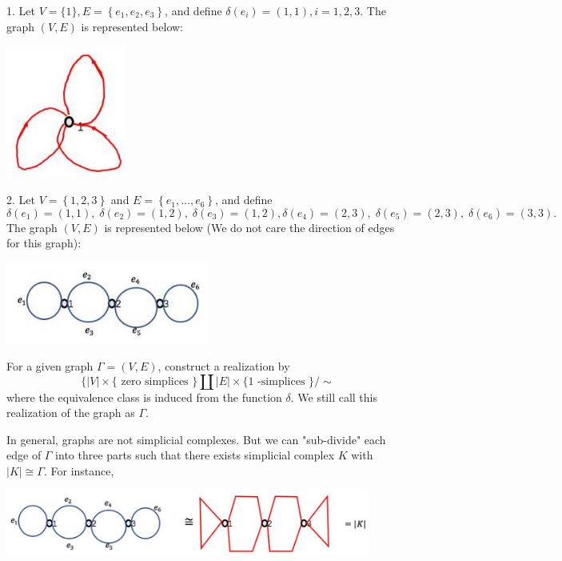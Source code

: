 \begin{example} 1. Let \(V = \{ 1\},E = \left\{  {{e}_{1},{e}_{2},{e}_{3}}\right\}\), and define \(\delta \left( {e}_{i}\right)  = \left( {1,1}\right),i = 1,2,3\). The graph $(V, E)$ is represented below:
\begin{center}
\includegraphics[width=0.3\textwidth]{images/Ch8_3_petal.jpg}
\end{center}

2. Let \(V = \left\{  1,2,3\right\}\) and \(E = \left\{  {{e}_{1},\ldots,{e}_{6}}\right\}\), and define
\[
\delta \left( {e}_{1}\right)  = \left( {1,1}\right),\;\delta \left( {e}_{2}\right)  = \left( {1,2}\right),\;\delta \left( {e}_{3}\right)  = \left( {1,2}\right),
\delta \left( {e}_{4}\right)  = \left( {2,3}\right),\;\delta \left( {e}_{5}\right)  = \left( {2,3}\right),\;\delta \left( {e}_{6}\right)  = \left( {3,3}\right).
\]
The graph $(V, E)$ is represented below (We do not care the direction of edges for this graph):
\begin{center}
\includegraphics[width=0.5\textwidth]{images/Ch8_4_circles.jpg}
\end{center}
\end{example}

\begin{definition}  For a given graph \(\Gamma  = \left( {V,E}\right)\), construct a realization by
\[
\{ \left| V\right|  \times  \{ \text{ zero simplices }\} \coprod \left| E\right|  \times  \{ 1\text{ -simplices } \} / \sim
\]
where the equivalence class is induced from the function \(\delta\). We still call this realization of the graph as \(\Gamma\).
\end{definition}

In general, graphs are not simplicial complexes. But we can "sub-divide" each edge of \(\Gamma\) into three parts such that there exists simplicial complex \(K\) with \(\left| K\right|  \cong  \Gamma\). For instance,
\begin{center}
\includegraphics[width=0.9\textwidth]{images/Ch8_simp_cplx.jpg}
\end{center}


